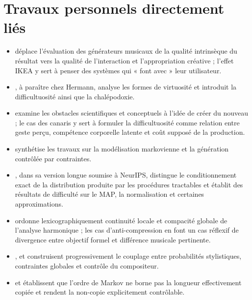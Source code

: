 \documentclass[11pt,a4paper]{article}
\begin{document}
\section{Travaux personnels directement liés}

\begin{itemize}
  \item \textcite{pachet2026generation} déplace l'évaluation des générateurs
        musicaux de la qualité intrinsèque du résultat vers la qualité de
        l'interaction et l'appropriation créative ; l'effet IKEA y sert à penser
        des systèmes qui « font avec » leur utilisateur.
  \item \textcite{pachet2027virtuosite}, à paraître chez Hermann, analyse les
        formes de virtuosité et introduit la difficultuosité ainsi que la
        chalépodoxie.
  \item \textcite{pachet2026impossibilite} examine les obstacles scientifiques
        et conceptuels à l'idée de créer du nouveau ; le cas des canaris y sert à
        formuler la difficultuosité comme relation entre geste perçu, compétence
        corporelle latente et coût supposé de la production.
  \item \textcite{pachet2026markov} synthétise les travaux sur la modélisation
        markovienne et la génération contrôlée par contraintes.
  \item \textcite{pachet2026biases}, dans sa version longue soumise à NeurIPS,
        distingue le conditionnement exact de la distribution produite par les
        procédures tractables et établit des résultats de difficulté sur le MAP,
        la normalisation et certaines approximations.
  \item \textcite{pachet2026tonalparsimony} ordonne lexicographiquement continuité
        locale et compacité globale de l'analyse harmonique ; les cas
        d'anti-compression en font un cas réflexif de divergence entre objectif
        formel et différence musicale pertinente.
  \item \textcite{pachet2011markov}, \textcite{barbieri2012lyrics} et
        \textcite{papadopoulos2016flowcomposer} construisent progressivement le
        couplage entre probabilités stylistiques, contraintes globales et contrôle
        du compositeur.
  \item \textcite{papadopoulos2014avoiding} et
        \textcite{papadopoulos2016nonplagiaristic} établissent que l'ordre de
        Markov ne borne pas la longueur effectivement copiée et rendent la
        non-copie explicitement contrôlable.

\end{itemize}
\end{document}
